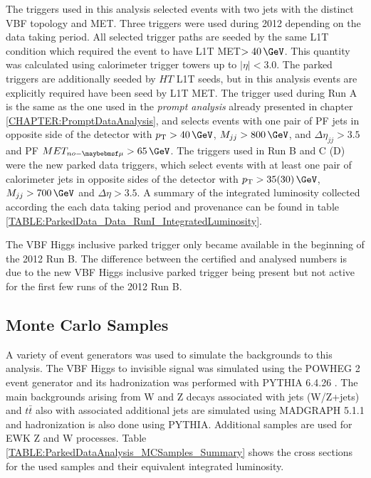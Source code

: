The triggers used in this analysis selected events with two jets with the distinct \gls{VBF} topology and \gls{MET}. Three triggers were used during 2012 depending on the data taking period. All selected trigger paths are seeded by the same \gls{L1T} condition which required the event to have \gls{L1T} \gls{MET}$>40\,\GeV$. This quantity was calculated using calorimeter trigger towers up to $|\eta|<3.0$. The parked triggers are additionally seeded by $HT$ \gls{L1T} seeds, but in this analysis events are explicitly required have been seed by \gls{L1T} \gls{MET}. The trigger used during Run A is the same as the one used in the \textit{prompt analysis} already presented in chapter \ref{CHAPTER:PromptDataAnalysis}, and selects events with one pair of \gls{PF} jets in opposite side of the detector with $\pt>40\,\GeV$, $M_{jj}>800\,\GeV$, and $\Delta\eta_{jj}>3.5$ and \gls{PF} $MET_{no-\mu}>65\,\GeV$. The triggers used in Run B and C (D) were the new parked data triggers, which select events with at least one pair of calorimeter jets in opposite sides of the detector with $\pt>35(30)\,\GeV$, $M_{jj}>700\,\GeV$ and $\Delta\eta>3.5$. A summary of the integrated luminosity collected according the each data taking period and provenance can be found in table \ref{TABLE:ParkedData_Data_RunI_IntegratedLuminosity}.



The \gls{VBF} Higgs inclusive parked trigger only became available in the beginning of the 2012 Run B. The difference between the certified and analysed numbers is due to the new \gls{VBF} Higgs inclusive parked trigger being present but not active for the first few runs of the 2012 Run B. 

\subsection{Monte Carlo Samples}


A variety of event generators was used to simulate the backgrounds to this analysis. The \gls{VBF} Higgs to invisible signal was simulated using the \textsc{POWHEG} 2 event generator \cite{ARTICLE:POWHEG_2004,ARTICLE:POWHEG_2007,ARTICLE:POWHEG_2009v1,ARTICLE:POWHEG_2009v2,ARTICLE:POWHEG_2010v1,ARTICLE:POWHEG_2010v2,ARTICLE:POWHEG_2011v1,ARTICLE:POWHEG_2011v2} and its hadronization was performed with \textsc{PYTHIA} 6.4.26 \cite{ARTICLE:Pythia6p4PhysicsAndManual}. The main backgrounds arising from W and Z decays associated with jets (W/Z+jets) and $t\bar{t}$ also with associated additional jets are simulated using \textsc{MADGRAPH} 5.1.1 \cite{ARTICLE:MadGraph5,ARTICLE:aMCatNLO} and hadronization is also done using \textsc{PYTHIA}. Additional samples are used for \gls{EWK} Z and W processes. Table \ref{TABLE:ParkedDataAnalysis_MCSamples_Summary} shows the cross sections for the used samples and their equivalent integrated luminosity.

